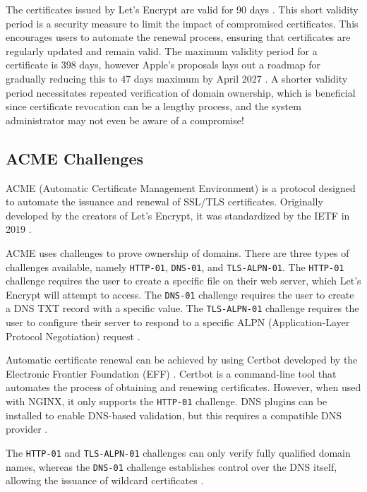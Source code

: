 The certificates issued by Let's Encrypt are valid for 90 days \Parencite{letsencrypt_faq}. This short validity period is a security measure to limit the impact of compromised certificates. This encourages users to automate the renewal process, ensuring that certificates are regularly updated and remain valid. The maximum validity period for a certificate is 398 days, however Apple's proposals lays out a roadmap for gradually reducing this to 47 days maximum by April 2027 \Parencite{globalsign_certificate_lifespans}. A shorter validity period necessitates repeated verification of domain ownership, which is beneficial since certificate revocation can be a lengthy process, and the system administrator may not even be aware of a compromise!

\subsection{ACME Challenges}\label{sec:acme_challenges}
ACME (Automatic Certificate Management Environment) is a protocol designed to automate the issuance and renewal of SSL/TLS certificates. Originally developed by the creators of Let's Encrypt, it was standardized by the IETF in 2019 \parencite{letsencrypt_isrg_anniversary}.

ACME uses challenges to prove ownership of domains. There are three types of challenges available, namely \texttt{HTTP-01}, \texttt{DNS-01}, and \texttt{TLS-ALPN-01}. The \texttt{HTTP-01} challenge requires the user to create a specific file on their web server, which Let's Encrypt will attempt to access. The \texttt{DNS-01} challenge requires the user to create a DNS TXT record with a specific value. The \texttt{TLS-ALPN-01} challenge requires the user to configure their server to respond to a specific ALPN (Application-Layer Protocol Negotiation) request \Parencite{letsencrypt_challenge_types}.

Automatic certificate renewal can be achieved by using Certbot developed by the Electronic Frontier Foundation (EFF) \parencite{letsencrypt_peter_eckersley}. Certbot is a command-line tool that automates the process of obtaining and renewing certificates. However, when used with NGINX, it only supports the \texttt{HTTP-01} challenge. DNS plugins can be installed to enable DNS-based validation, but this requires a compatible DNS provider \parencite{certbot_plugins}.

The \texttt{HTTP-01} and \texttt{TLS-ALPN-01} challenges can only verify fully qualified domain names, whereas the \texttt{DNS-01} challenge establishes control over the DNS itself, allowing the issuance of wildcard certificates \Parencite{letsencrypt_challenge_types}.


